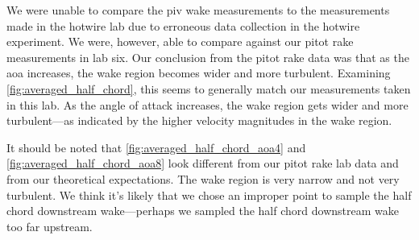 We were unable to compare the \acrshort{piv} wake measurements to the measurements made in the hotwire lab due to erroneous data collection in the hotwire experiment. We were, however, able to compare against our pitot rake measurements in lab six. Our conclusion from the pitot rake data was that as the \acrshort{aoa} increases, the wake region becomes wider and more turbulent. Examining \autoref{fig:averaged_half_chord}, this seems to generally match our measurements taken in this lab. As the angle of attack increases, the wake region gets wider and more turbulent—as indicated by the higher velocity magnitudes in the wake region.

It should be noted that \autoref{fig:averaged_half_chord_aoa4} and \autoref{fig:averaged_half_chord_aoa8} look different from our pitot rake lab data and from our theoretical expectations. The wake region is very narrow and not very turbulent. We think it's likely that we chose an improper point to sample the half chord downstream wake—perhaps we sampled the half chord downstream wake too far upstream.